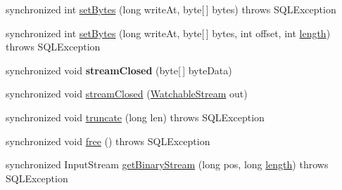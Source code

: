\begin{DoxyCompactItemize}
\item 
synchronized int \mbox{\hyperlink{classcom_1_1mysql_1_1cj_1_1jdbc_1_1_blob_a34f9a18a23ec153717f7b191dae58ab4}{set\+Bytes}} (long write\+At, byte\mbox{[}$\,$\mbox{]} bytes)  throws S\+Q\+L\+Exception 
\item 
synchronized int \mbox{\hyperlink{classcom_1_1mysql_1_1cj_1_1jdbc_1_1_blob_a5c16cdab1cc1ff37a3b1267dec9d6b28}{set\+Bytes}} (long write\+At, byte\mbox{[}$\,$\mbox{]} bytes, int offset, int \mbox{\hyperlink{classcom_1_1mysql_1_1cj_1_1jdbc_1_1_blob_a21cf04a4632ad74337cf8a867bae61e3}{length}})  throws S\+Q\+L\+Exception 
\item 
\mbox{\label{classcom_1_1mysql_1_1cj_1_1jdbc_1_1_blob_a13587ebf1755da02db82fb506459e225}} 
synchronized void {\bfseries stream\+Closed} (byte\mbox{[}$\,$\mbox{]} byte\+Data)
\item 
synchronized void \mbox{\hyperlink{classcom_1_1mysql_1_1cj_1_1jdbc_1_1_blob_a891c76fb3123f5d9f736e05d50ed1fe8}{stream\+Closed}} (\mbox{\hyperlink{interfacecom_1_1mysql_1_1cj_1_1protocol_1_1_watchable_stream}{Watchable\+Stream}} out)
\item 
synchronized void \mbox{\hyperlink{classcom_1_1mysql_1_1cj_1_1jdbc_1_1_blob_a423c316889dc06f59cbaee6f77c6401f}{truncate}} (long len)  throws S\+Q\+L\+Exception 
\item 
synchronized void \mbox{\hyperlink{classcom_1_1mysql_1_1cj_1_1jdbc_1_1_blob_a60c2e9853dd25824771ebfd142d89f2d}{free}} ()  throws S\+Q\+L\+Exception 
\item 
synchronized Input\+Stream \mbox{\hyperlink{classcom_1_1mysql_1_1cj_1_1jdbc_1_1_blob_a000b7ade4e7fea17e5d40085a2a9dabe}{get\+Binary\+Stream}} (long pos, long \mbox{\hyperlink{classcom_1_1mysql_1_1cj_1_1jdbc_1_1_blob_a21cf04a4632ad74337cf8a867bae61e3}{length}})  throws S\+Q\+L\+Exception 
\end{DoxyCompactItemize}


